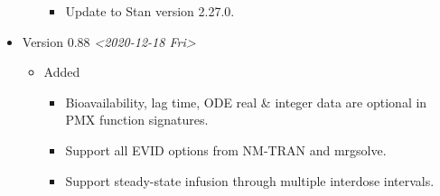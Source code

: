\documentclass[12pt, reqno, oneside]{amsbook}
\numberwithin{equation}{chapter}
\numberwithin{figure}{chapter}
\numberwithin{table}{chapter}
\theoremstyle{remark}
\begin{document}
\begin{itemize}
\begin{itemize}
\begin{itemize}
\item Update to Stan version 2.27.0.
\end{itemize}
\end{itemize}
\item Version 0.88 \textit{<2020-12-18 Fri>}
\begin{itemize}
\item Added
\begin{itemize}
\item Bioavailability, lag time, ODE real \& integer data are optional in PMX function signatures.
\item Support all EVID options from NM-TRAN and mrgsolve.
\item Support steady-state infusion through multiple interdose intervals.
\end{itemize}
\end{itemize}


\end{itemize}
\end{document}
